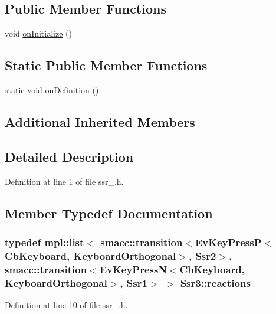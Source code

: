 \subsection*{Public Member Functions}
\begin{DoxyCompactItemize}
\item 
void \hyperlink{structSsr3_aa20ad5030a625d39522d559ebe75feb0}{on\+Initialize} ()
\end{DoxyCompactItemize}
\subsection*{Static Public Member Functions}
\begin{DoxyCompactItemize}
\item 
static void \hyperlink{structSsr3_a57a64c1b26c2967aff8f55077f0b2553}{on\+Definition} ()
\end{DoxyCompactItemize}
\subsection*{Additional Inherited Members}


\subsection{Detailed Description}


Definition at line 1 of file ssr\+\_.\+h.



\subsection{Member Typedef Documentation}
\subsubsection[{\texorpdfstring{reactions}{reactions}}]{\setlength{\rightskip}{0pt plus 5cm}typedef mpl\+::list$<$ {\bf smacc\+::transition}$<$Ev\+Key\+PressP$<$Cb\+Keyboard, Keyboard\+Orthogonal$>$, {\bf Ssr2}$>$, {\bf smacc\+::transition}$<$Ev\+Key\+PressN$<$Cb\+Keyboard, Keyboard\+Orthogonal$>$, {\bf Ssr1}$>$ $>$ {\bf Ssr3\+::reactions}}\hypertarget{structSsr3_a93a31de201b27c1ed5b9d20c57d56d62}{}\label{structSsr3_a93a31de201b27c1ed5b9d20c57d56d62}


Definition at line 10 of file ssr\+\_.\+h.



